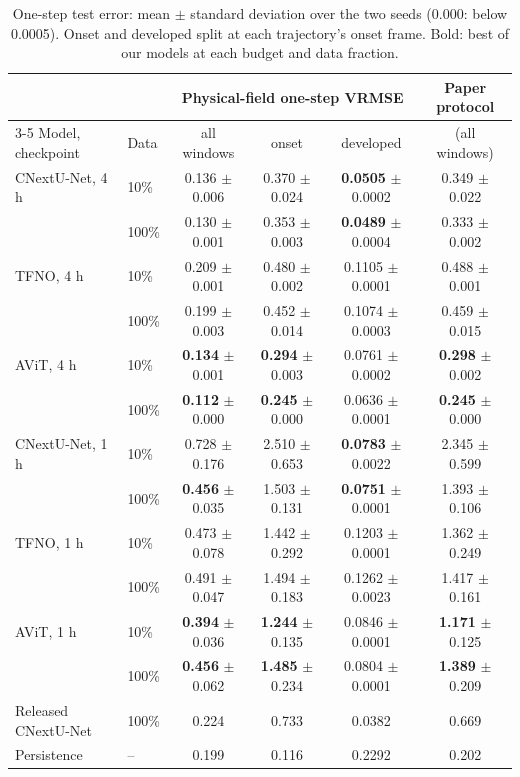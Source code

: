 \documentclass[11pt]{article}
\begin{document}
\begin{table}[!htbp]
\centering\small
\begin{tabular}{@{}llcccc@{}}
\toprule
& & \multicolumn{3}{c}{Physical-field one-step VRMSE} & Paper protocol \\
\cmidrule(lr){3-5}
Model, checkpoint & Data & all windows & onset & developed & (all windows) \\
\midrule
CNextU-Net, 4 h & 10\% & 0.136 $\pm$ 0.006 & 0.370 $\pm$ 0.024 & \textbf{0.0505} $\pm$ 0.0002 & 0.349 $\pm$ 0.022 \\
                & 100\% & 0.130 $\pm$ 0.001 & 0.353 $\pm$ 0.003 & \textbf{0.0489} $\pm$ 0.0004 & 0.333 $\pm$ 0.002 \\
TFNO, 4 h & 10\% & 0.209 $\pm$ 0.001 & 0.480 $\pm$ 0.002 & 0.1105 $\pm$ 0.0001 & 0.488 $\pm$ 0.001 \\
          & 100\% & 0.199 $\pm$ 0.003 & 0.452 $\pm$ 0.014 & 0.1074 $\pm$ 0.0003 & 0.459 $\pm$ 0.015 \\
AViT, 4 h & 10\% & \textbf{0.134} $\pm$ 0.001 & \textbf{0.294} $\pm$ 0.003 & 0.0761 $\pm$ 0.0002 & \textbf{0.298} $\pm$ 0.002 \\
          & 100\% & \textbf{0.112} $\pm$ 0.000 & \textbf{0.245} $\pm$ 0.000 & 0.0636 $\pm$ 0.0001 & \textbf{0.245} $\pm$ 0.000 \\
\midrule
CNextU-Net, 1 h & 10\% & 0.728 $\pm$ 0.176 & 2.510 $\pm$ 0.653 & \textbf{0.0783} $\pm$ 0.0022 & 2.345 $\pm$ 0.599 \\
                & 100\% & \textbf{0.456} $\pm$ 0.035 & 1.503 $\pm$ 0.131 & \textbf{0.0751} $\pm$ 0.0001 & 1.393 $\pm$ 0.106 \\
TFNO, 1 h & 10\% & 0.473 $\pm$ 0.078 & 1.442 $\pm$ 0.292 & 0.1203 $\pm$ 0.0001 & 1.362 $\pm$ 0.249 \\
          & 100\% & 0.491 $\pm$ 0.047 & 1.494 $\pm$ 0.183 & 0.1262 $\pm$ 0.0023 & 1.417 $\pm$ 0.161 \\
AViT, 1 h & 10\% & \textbf{0.394} $\pm$ 0.036 & \textbf{1.244} $\pm$ 0.135 & 0.0846 $\pm$ 0.0001 & \textbf{1.171} $\pm$ 0.125 \\
          & 100\% & \textbf{0.456} $\pm$ 0.062 & \textbf{1.485} $\pm$ 0.234 & 0.0804 $\pm$ 0.0001 & \textbf{1.389} $\pm$ 0.209 \\
\midrule
Released CNextU-Net & 100\% & 0.224 & 0.733 & 0.0382 & 0.669 \\
Persistence & -- & 0.199 & 0.116 & 0.2292 & 0.202 \\
\bottomrule
\end{tabular}
\caption{One-step test error: mean $\pm$ standard deviation over the two seeds (0.000: below 0.0005). Onset and
developed split at each trajectory's onset frame. Bold: best of our models at each budget and data fraction.}
\label{tab:test}
\end{table}
\end{document}
